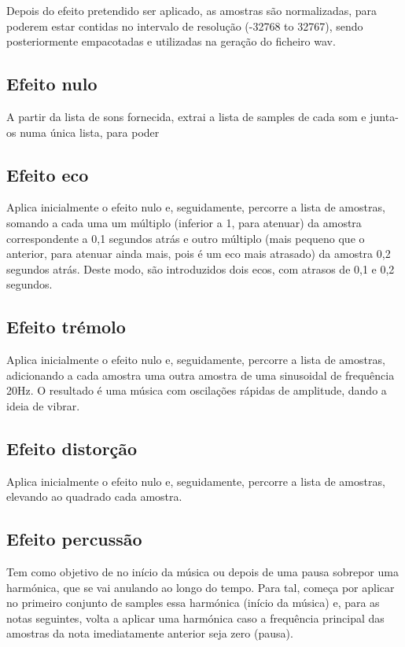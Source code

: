 Depois do efeito pretendido ser aplicado, as amostras são normalizadas, para poderem estar contidas no intervalo de resolução (-32768 to 32767), sendo posteriormente empacotadas e utilizadas na geração do ficheiro wav.

\subsection{Efeito nulo}
A partir da lista de sons fornecida, extrai a lista de samples de cada som e junta-os numa única lista, para poder

\subsection{Efeito eco}
Aplica inicialmente o efeito nulo e, seguidamente, percorre a lista de amostras, somando a cada uma um múltiplo (inferior a 1, para atenuar) da amostra correspondente a 0,1 segundos atrás e outro múltiplo (mais pequeno que o anterior, para atenuar ainda mais, pois é um eco mais atrasado) da amostra 0,2 segundos atrás. Deste modo, são introduzidos dois ecos, com atrasos de 0,1 e 0,2 segundos.

\subsection{Efeito trémolo}
Aplica inicialmente o efeito nulo e, seguidamente, percorre a lista de amostras, adicionando a cada amostra uma outra amostra de uma sinusoidal de frequência 20Hz. O resultado é uma música com oscilações rápidas de amplitude, dando a ideia de vibrar.

\subsection{Efeito distorção}
Aplica inicialmente o efeito nulo e, seguidamente, percorre a lista de amostras, elevando ao quadrado cada amostra.

\subsection{Efeito percussão}
Tem como objetivo de no início da música ou depois de uma pausa sobrepor uma harmónica, que se vai anulando ao longo do tempo. Para tal, começa por aplicar no primeiro conjunto de samples essa harmónica (início da música) e, para as notas seguintes, volta a aplicar uma harmónica caso a frequência principal das amostras da nota imediatamente anterior seja zero (pausa).


